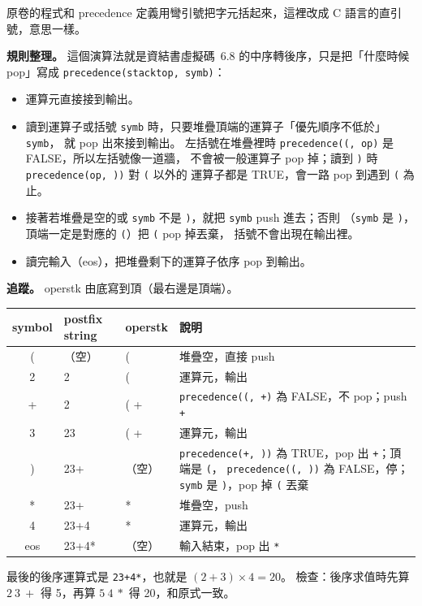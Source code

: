 \begin{pastsoln}
原卷的程式和 precedence 定義用彎引號把字元括起來，這裡改成 C 語言的直引號，意思一樣。

\textbf{規則整理。} 這個演算法就是資結書虛擬碼~6.8 的中序轉後序，只是把「什麼時候 pop」寫成
\texttt{precedence(stacktop, symb)}：
\begin{itemize}
\item 運算元直接接到輸出。
\item 讀到運算子或括號 \texttt{symb} 時，只要堆疊頂端的運算子「優先順序不低於」\texttt{symb}，
就 pop 出來接到輸出。 左括號在堆疊裡時 \texttt{precedence(\textquotesingle{}(\textquotesingle{}, op)} 是 FALSE，所以左括號像一道牆，
不會被一般運算子 pop 掉；讀到 \texttt{\textquotesingle{})\textquotesingle{}} 時 \texttt{precedence(op, \textquotesingle{})\textquotesingle{})} 對 \texttt{\textquotesingle{}(\textquotesingle{}} 以外的
運算子都是 TRUE，會一路 pop 到遇到 \texttt{\textquotesingle{}(\textquotesingle{}} 為止。
\item 接著若堆疊是空的或 \texttt{symb} 不是 \texttt{\textquotesingle{})\textquotesingle{}}，就把 \texttt{symb} push 進去；否則
（\texttt{symb} 是 \texttt{\textquotesingle{})\textquotesingle{}}，頂端一定是對應的 \texttt{\textquotesingle{}(\textquotesingle{}}）把 \texttt{\textquotesingle{}(\textquotesingle{}} pop 掉丟棄，
括號不會出現在輸出裡。
\item 讀完輸入（eos），把堆疊剩下的運算子依序 pop 到輸出。
\end{itemize}

\textbf{追蹤。} operstk 由底寫到頂（最右邊是頂端）。
\begin{center}
\begin{tabular}{cll>{\raggedright\arraybackslash}p{6.2cm}}
\toprule
symbol & postfix string & operstk & 說明 \\
\midrule
( & （空） & ( & 堆疊空，直接 push \\
2 & 2 & ( & 運算元，輸出 \\
+ & 2 & ( + & \texttt{precedence(\textquotesingle{}(\textquotesingle{}, \textquotesingle{}+\textquotesingle{})} 為 FALSE，不 pop；push \texttt{+} \\
3 & 23 & ( + & 運算元，輸出 \\
) & 23+ & （空） & \texttt{precedence(\textquotesingle{}+\textquotesingle{}, \textquotesingle{})\textquotesingle{})} 為 TRUE，pop 出 \texttt{+}；頂端是 \texttt{\textquotesingle{}(\textquotesingle{}}，
\texttt{precedence(\textquotesingle{}(\textquotesingle{}, \textquotesingle{})\textquotesingle{})} 為 FALSE，停；\texttt{symb} 是 \texttt{\textquotesingle{})\textquotesingle{}}，pop 掉 \texttt{\textquotesingle{}(\textquotesingle{}} 丟棄 \\
* & 23+ & * & 堆疊空，push \\
4 & 23+4 & * & 運算元，輸出 \\
eos & 23+4* & （空） & 輸入結束，pop 出 \texttt{*} \\
\bottomrule
\end{tabular}
\end{center}
最後的後序運算式是 \texttt{23+4*}，也就是 $(2+3)\times 4 = 20$。 檢查：後序求值時先算
$2\ 3\ +$ 得 5，再算 $5\ 4\ *$ 得 20，和原式一致。
\end{pastsoln}
